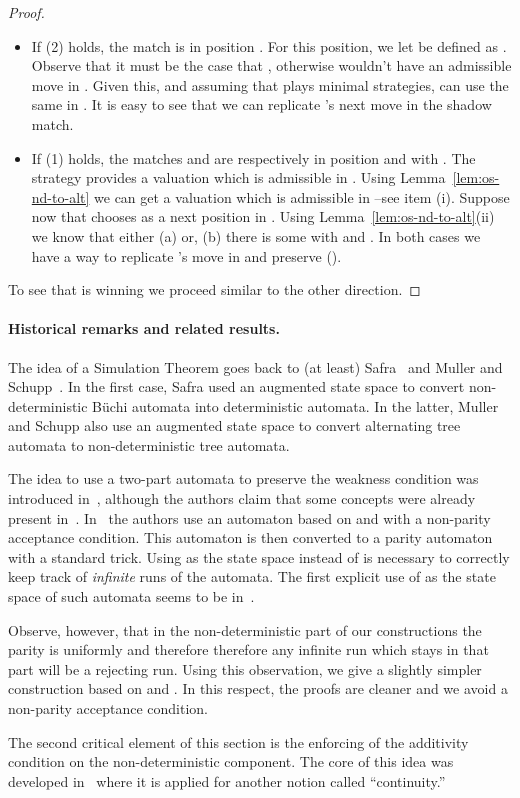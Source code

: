 \begin{proof}
\begin{itemize}
	\item If (2) holds, the match  is in position . For this position, we let  be defined as . Observe that it must be the case that , otherwise \eloise wouldn't have an admissible move  in . Given this, and assuming that \eloise plays minimal strategies, \eloise can use the same  in . It is easy to see that we can replicate \abelard's next move in the shadow match.
\item If (1) holds, the matches  and  are respectively in position  and  with . The strategy  provides a valuation  which is admissible in . Using Lemma~\ref{lem:os-nd-to-alt} we can get a valuation  which is admissible in  --see item (i). Suppose now that \abelard chooses  as a next position in . Using Lemma~\ref{lem:os-nd-to-alt}(ii) we know that either (a)  or, (b) there is some  with  and . In both cases we have a way to replicate \abelard's move in  and preserve ().
\end{itemize}
To see that  is winning we proceed similar to the other direction.
\end{proof}

\paragraph{Historical remarks and related results.}
The idea of a Simulation Theorem goes back to (at least) Safra~\cite{Safra:1988} and Muller and Schupp~\cite{MullerSimulation}. In the first case, Safra used an augmented state space to convert non-deterministic B\"uchi automata into deterministic automata. In the latter, Muller and Schupp also use an augmented state space to convert alternating tree automata to non-deterministic tree automata.

The idea to use a two-part automata to preserve the weakness condition was introduced in~\cite{Zanasi:Thesis:2012,DBLP:conf/lics/FacchiniVZ13}, although the authors claim that some concepts were already present in~\cite{MullerSaoudiSchupp92}. In~\cite{Zanasi:Thesis:2012,DBLP:conf/lics/FacchiniVZ13} the authors use an automaton based on  and  with a non-parity acceptance condition. This automaton is then converted to a parity automaton with a standard trick. Using  as the state space instead of  is necessary to correctly keep track of \emph{infinite} runs of the automata. The first explicit use of  as the state space of such automata seems to be in~\cite[Section~9.6.2]{ArnoldN01}.

Observe, however, that in the non-deterministic part of our constructions the parity is uniformly  and therefore therefore any infinite run which stays in that part will be a rejecting run. Using this observation, we give a slightly simpler construction based on  and . In this respect, the proofs are cleaner and we avoid a non-parity acceptance condition.

The second critical element of this section is the enforcing of the additivity condition on the non-deterministic component. The core of this idea was developed in~\cite{LICS14,DBLP:journals/corr/CarreiroFVZ14} where it is applied for another notion called ``continuity.''
